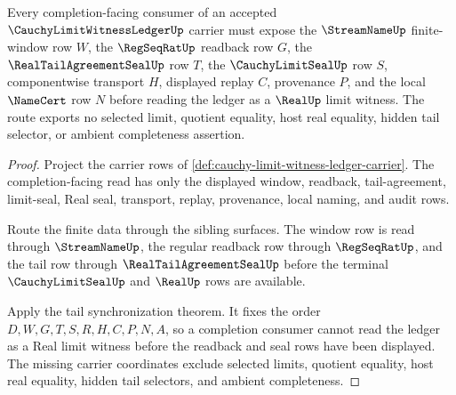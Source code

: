\begin{theorem}
\label{thm:cauchy-limit-witness-ledger-readback-seal-obligation}
Every completion-facing consumer of an accepted $\CauchyLimitWitnessLedgerUp$ carrier must expose the $\StreamNameUp$ finite-window row $W$, the $\RegSeqRatUp$ readback row $G$, the $\RealTailAgreementSealUp$ row $T$, the $\CauchyLimitSealUp$ row $S$, componentwise transport $H$, displayed replay $C$, provenance $P$, and the local $\NameCert$ row $N$ before reading the ledger as a $\RealUp$ limit witness. The route exports no selected limit, quotient equality, host real equality, hidden tail selector, or ambient completeness assertion.
\end{theorem}
\begin{proof}
Project the carrier rows of \autoref{def:cauchy-limit-witness-ledger-carrier}. The completion-facing read has only the displayed window, readback, tail-agreement, limit-seal, Real seal, transport, replay, provenance, local naming, and audit rows.

Route the finite data through the sibling surfaces. The window row is read through $\StreamNameUp$, the regular readback row through $\RegSeqRatUp$, and the tail row through $\RealTailAgreementSealUp$ before the terminal $\CauchyLimitSealUp$ and $\RealUp$ rows are available.

Apply the tail synchronization theorem. It fixes the order $D,W,G,T,S,R,H,C,P,N,A$, so a completion consumer cannot read the ledger as a Real limit witness before the readback and seal rows have been displayed. The missing carrier coordinates exclude selected limits, quotient equality, host real equality, hidden tail selectors, and ambient completeness.
\end{proof}

